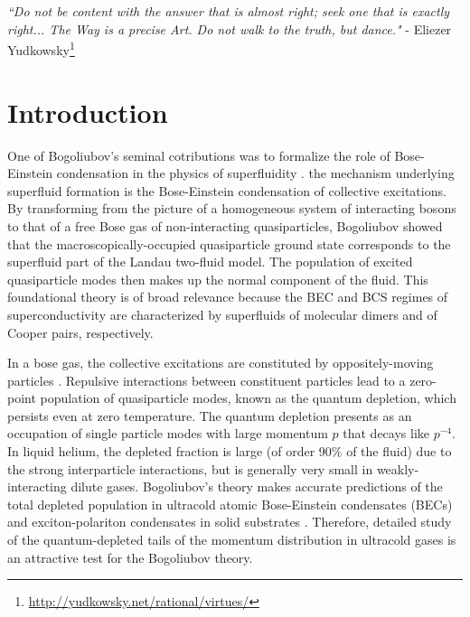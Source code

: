 
\begin{adjustwidth}{3cm}{0cm}
\begin{flushright}
\emph{``Do not be content with the answer that is almost right; seek one that is exactly right... The Way is a precise Art. Do not walk to the truth, but dance."} - Eliezer Yudkowsky\footnote{\url{http://yudkowsky.net/rational/virtues/}}
\end{flushright}
\end{adjustwidth}


\section{Introduction} 
	One of Bogoliubov's seminal cotributions was to formalize the role of Bose-Einstein condensation in the physics of superfluidity \cite{Bogolubov47}.
	the mechanism underlying superfluid formation is the Bose-Einstein condensation of collective excitations. 
	By transforming from the picture of a homogeneous system of interacting bosons to that of a free Bose gas of non-interacting quasiparticles, Bogoliubov showed that the macroscopically-occupied quasiparticle ground state corresponds to the superfluid part of the Landau two-fluid model.
	The population of excited quasiparticle modes then makes up the normal component of the fluid. 
	This foundational theory is of broad relevance because the BEC and BCS regimes of superconductivity are characterized by superfluids of molecular dimers and of Cooper pairs, respectively.   

	In a bose gas, the collective excitations are constituted by oppositely-moving particles \cite{Vogels02}. 
	Repulsive interactions between constituent particles lead to a zero-point population of quasiparticle modes, known as the quantum depletion, which persists even at zero temperature. 
	The quantum depletion presents as an occupation of single particle modes with large momentum $p$ that decays like $p^{-4}$.
	In liquid helium, the depleted fraction is large (of order 90\% of the fluid) due to the strong interparticle interactions, but is generally very small in weakly-interacting dilute gases.
	Bogoliubov's theory makes accurate predictions of the total depleted population in ultracold atomic Bose-Einstein condensates (BECs) \cite{xu06,lopes17_depletion} and exciton-polariton condensates in solid substrates \cite{pieczarka20}.
	Therefore, detailed study of the quantum-depleted tails of the momentum distribution in ultracold gases is an attractive test for the Bogoliubov theory.

